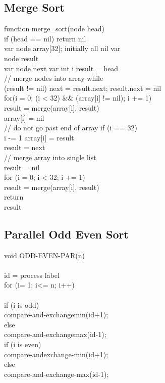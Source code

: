 \documentclass[a4paper,12pt]{article}
\begin{document}
	\subsection{Merge Sort}
	function merge\_sort(node head) 								\\ 
	if (head == nil)  	return nil 								\\
	var node array[32]; initially all nil var 					\\
	node result 												\\
	var node next var int i result = head						\\ 
	// merge nodes into array while 							\\
	(result != nil) next = result.next;  	result.next = nil 	\\
	for(i = 0; (i < 32) \&\& (array[i] != nil); i += 1) 		\\
	result = merge(array[i], result) 							\\
	array[i] = nil 												\\
	// do not go past end of array if (i == 32)					\\ 
	i -= 1 array[i] = result 									\\
	result = next 												\\
	// merge array into single list								\\ 
	result = nil 												\\
	for (i = 0; i < 32; i += 1) 								\\
		result = merge(array[i], result) 						\\
	return 														\\
	result 														\\
	
	\subsection{Parallel Odd Even Sort}
	void ODD-EVEN-PAR(n) 										\\
	{ 															\\
		id = process label 										\\
		for (i= 1; i<= n; i++) 									\\
		{ 														\\
			if (i is odd) 										\\
				compare-and-exchangemin(id+1);					\\
			else												\\
				compare-and-exchangemax(id-1);					\\
			if (i is even)										\\
				compare-andexchange-min(id+1); 					\\
			else 												\\
				compare-and-exchange-max(id-1); 				\\
		} 														\\
	}															\\
\end{document}
